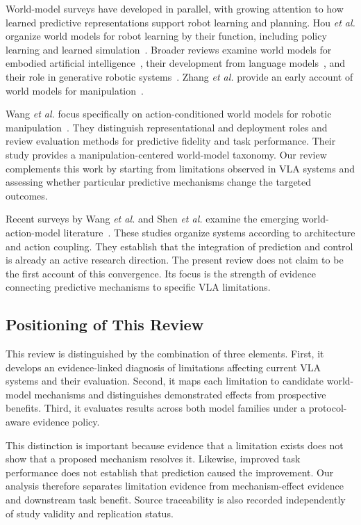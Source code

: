 \documentclass{ieeeaccess}
\begin{document}
World-model surveys have developed in parallel, with growing attention to how learned predictive representations support robot learning and planning. Hou \emph{et al.} organize world models for robot learning by their function, including policy learning and learned simulation~\cite{hou2026wm}. Broader reviews examine world models for embodied artificial intelligence~\cite{li2025wm}, their development from language models~\cite{feng2025}, and their role in generative robotic systems~\cite{zhang2025generative,ding2025worldsurvey}. \textcolor[RGB]{104,48,148}{Zhang \emph{et al.}} provide an early account of world models for manipulation~\cite{li2025step}.

Wang \emph{et al.} focus specifically on action-conditioned world models for robotic manipulation~\cite{wang2026manipwmsurvey}. They distinguish representational and deployment roles and review evaluation methods for predictive fidelity and task performance. Their study provides a manipulation-centered world-model taxonomy. Our review complements this work by starting from limitations observed in VLA systems and assessing whether particular predictive mechanisms change the targeted outcomes.

Recent surveys by Wang \emph{et al.} and Shen \emph{et al.} examine the emerging world-action-model literature~\cite{wamfrontier,wamsurvey}. These studies organize systems according to architecture and action coupling. They establish that the integration of prediction and control is already an active research direction. The present review does not claim to be the first account of this convergence. Its focus is the strength of evidence connecting predictive mechanisms to specific VLA limitations.


\subsection{Positioning of This Review}

This review is distinguished by the combination of three elements. First, it develops an evidence-linked diagnosis of limitations affecting current VLA systems and their evaluation. Second, it maps each limitation to candidate world-model mechanisms and distinguishes demonstrated effects from prospective benefits. Third, it evaluates results across both model families under a protocol-aware evidence policy.

This distinction is important because evidence that a limitation exists does not show that a proposed mechanism resolves it. Likewise, improved task performance does not establish that prediction caused the improvement. Our analysis therefore separates limitation evidence from mechanism-effect evidence and downstream task benefit. Source traceability is also recorded independently of study validity and replication status.
\end{document}
